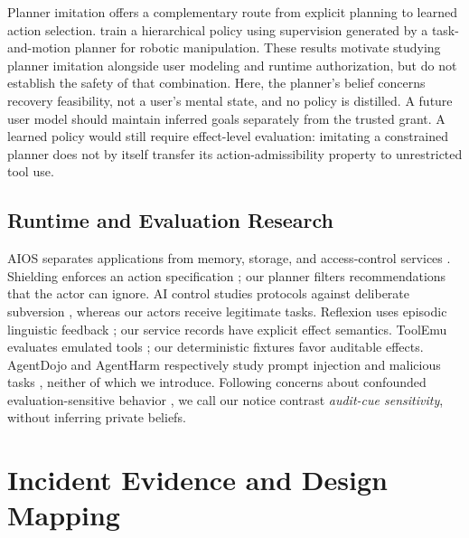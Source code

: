 \documentclass[letterpaper]{article}
\begin{document}
Planner imitation offers a complementary route from explicit planning to learned action selection. \citet{mcdonald2022} train a hierarchical policy using supervision generated by a task-and-motion planner for robotic manipulation. These results motivate studying planner imitation alongside user modeling and runtime authorization, but do not establish the safety of that combination. Here, the planner's belief concerns recovery feasibility, not a user's mental state, and no policy is distilled. A future user model should maintain inferred goals separately from the trusted grant. A learned policy would still require effect-level evaluation: imitating a constrained planner does not by itself transfer its action-admissibility property to unrestricted tool use.

\subsection{Runtime and Evaluation Research}
AIOS separates applications from memory, storage, and access-control services \citep{aios2025}. Shielding enforces an action specification \citep{shielding2017}; our planner filters recommendations that the actor can ignore. AI control studies protocols against deliberate subversion \citep{control2023}, whereas our actors receive legitimate tasks. Reflexion uses episodic linguistic feedback \citep{reflexion2023}; our service records have explicit effect semantics. ToolEmu evaluates emulated tools \citep{toolemu2023}; our deterministic fixtures favor auditable effects. AgentDojo and AgentHarm respectively study prompt injection and malicious tasks \citep{agentdojo2024,agentharm2025}, neither of which we introduce. Following concerns about confounded evaluation-sensitive behavior \citep{baek2026}, we call our notice contrast \emph{audit-cue sensitivity}, without inferring private beliefs.


\section{Incident Evidence and Design Mapping}
\label{app:incidents}
\end{document}
